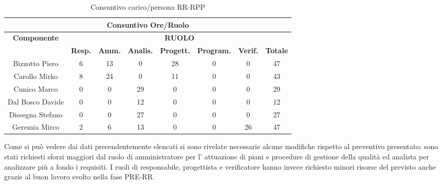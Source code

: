 \begin{table}[!h]
	\begin{center}
		  \begin{tabular}
			  {|c|c|c|c|c|c|c|c|}
		 \hline
			\multicolumn{8}{|c|}{ \textbf{Consuntivo Ore/Ruolo} } \\
			\hline
			\textbf{Componente} & \multicolumn{7}{|c|}{ \textbf{RUOLO} } \\
			\hline
			& \textbf{Resp.} & \textbf{Amm.} & \textbf{Analis.} & \textbf{Progett.} & \textbf{Program.} & \textbf{Verif.}  & \textbf{Totale}\\
			\hline
			Bizzotto Piero &  6   &  13 &  0   &   28  &  0   &  0  &  47 \\ %
			\hline
			Carollo Mirko &  8   &  24  &  0  &  11   &  0   &  0   &  43\\ %
			\hline
			Cunico Marco    &  0   &  0  &  29   &  0   &  0  &  0   &  29\\ %
			\hline
			Dal Bosco Davide   &  0   &  0   &  12   &  0   &   0  &  0  &  12\\ %
			\hline
			Dissegna Stefano        &  0  &  0   & 27  &  0   &  0  &  0  &  27\\ %
			\hline
			Geremia Mirco   &   2  &  6   &  13  &  0  &  0   &  26   &  47\\ %
			\hline		
		\end{tabular}
	\caption{Consuntivo carico/persona RR-RPP} %
	\label{tab: ConsPersOre_RR-RPP}
	\end{center}	
\end{table}

Come si pu\`o vedere dai dati precendentemente elencati si sono rivelate necessarie alcune modifiche rispetto al preventivo presentato:
sono stati richiesti sforzi maggiori dal ruolo di amministratore per l' attuazione di piani e procedure di gestione della qualit\`a ed
analista per analizzare pi\`u a fondo i requisiti. I ruoli di responsabile, progettista e verificatore hanno invece richiesto minori
risorse del previsto anche grazie al buon lavoro svolto nella fase PRE-RR.

